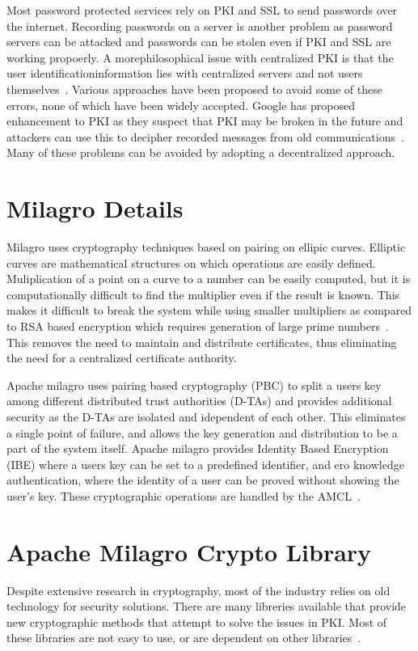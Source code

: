 Most password protected services rely on PKI and SSL to send passwords
over the internet. Recording passwords on a server is another problem
as password servers can be attacked and passwords can be stolen even
if PKI and SSL are working propoerly. A morephilosophical issue with
centralized PKI is that the user identificationinformation lies with
centralized servers and not users
themselves~\cite{distlab-pki-problems}.  Various approaches have been
proposed to avoid some of these errors, none of which have been widely
accepted. Google has proposed enhancement to PKI as they suspect that
PKI may be broken in the future and attackers can use this to decipher
recorded messages from old
communications~\cite{securityweek-ssl-threats}.  Many of these
problems can be avoided by adopting a decentralized approach.


\section{Milagro Details}
Milagro uses cryptography techniques based on pairing on ellipic
curves. Elliptic curves are mathematical structures on which
operations are easily defined. Muliplication of a point on a curve to
a number can be easily computed, but it is computationally difficult
to find the multiplier even if the result is known. This makes it
difficult to break the system while using smaller multipliers as
compared to RSA based encryption which requires generation of large
prime numbers~\cite{milagro-concepts}. This removes the need to
maintain and distribute certificates, thus eliminating the need for a
centralized certificate authority.

Apache milagro uses pairing based cryptography (PBC) to split a users
key among different distributed trust authorities (D-TAs) and provides
additional security as the D-TAs are isolated and idependent of each
other. This eliminates a single point of failure, and allows the key
generation and distribution to be a part of the system itself. Apache
milagro provides Identity Based Encryption (IBE) where a users key can
be set to a predefined identifier, and ero knowledge authentication,
where the identity of a user can be proved without showing the user's
key.  These cryptographic operations are handled by the
AMCL~\cite{milagro-concepts}.

\section{Apache Milagro Crypto Library}
Despite extensive research in cryptography, most of the industry
relies on old technology for security solutions. There are many
libreries available that provide new cryptographic methods that
attempt to solve the issues in PKI. Most of these libraries are not
easy to use, or are dependent on other
libraries~\cite{mcl-white-paper}.

